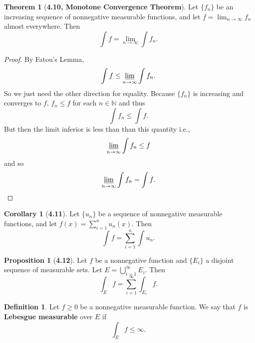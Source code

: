\documentclass[12pt]{article}
\newcommand{\N}{\mathbb{N}}
\theoremstyle{definition}
\newtheorem*{thm}{Theorem}
\newtheorem*{definition}{Definition}
\newtheorem*{cor}{Corollary}
\newtheorem*{prop}{Proposition}
\begin{document}
\begin{thm}[\textbf{4.10, Monotone Convergence Theorem}]

  Let \( \{f_n\} \) be an increasing sequence of nonnegative measurable functions, and let \( \displaystyle f = \lim_{n \to \infty} f_n \) almost everywhere. Then 
    \[
        \int f = \lim_{n \to \infty} \int f_n.
    \]
  \begin{proof}
    By Fatou's Lemma,
      \[
        \int f \leq \varliminf_{n \to \infty} \int f_n.
      \]
    So we just need the other direction for equality. Because \( \{ f_n\} \) is increasing and converges to \( f \), \( f_n \leq f \) for each \( n \in \N \) and thus
      \[
        \int f_n \leq \int f.
      \]
    But then the limit inferior is less than than this quantity i.e., 
      \[
          \varliminf_{n \to \infty} \int f_n \leq f 
      \]
    and so 
      \[  
          \varliminf_{n \to \infty} \int f_n =  \int f. 
      \]
  \end{proof}


\end{thm}

\begin{cor}[\textbf{4.11}]

  Let \( \{u_n\} \) be a sequence of nonnegative measurable functions, and let \( \displaystyle f(x) = \sum_{i=1}^{n} u_n(x) \). Then 
    \[
      \int f = \sum_{i=1}^{n} \int u_n.  
    \]
  
\end{cor}

\begin{prop}[\textbf{4.12}]

    Let \( f \) be a nonnegative function and \( \{ E_i \} \) a disjoint sequence of measurable sets. Let \( \displaystyle E = \bigcup_{i=1}^{\infty} E_i \). Then
      \[
          \int_{E} f = \sum_{i=1}^{\infty} \int_{E_i} f.
      \]
  
    
\end{prop}

\begin{definition}
  Let \( f \geq 0 \) be a nonnegative measurable function. We say that \( f \) is \textbf{Lebesgue measurable} over \( E \) if
    \[
        \int_{E} f \leq \infty.
    \]
\end{definition}
\end{document}
